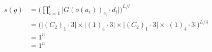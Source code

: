 \documentclass[preview]{standalone}
\begin{document}
\begin{align*}
s(g) &= \big(\prod_{i=1}^{l}\big|G(o(a_i))_{c_i}\cdot d_i\big|\big)^{L/l} \\   &= \big(\big|(C_2)_1\cdot 3\big| \times \big|(1)_4\cdot 3\big|\times \big|(C_2)_1\cdot 3\big| \times \big|(1)_4\cdot 3\big|)^{L/4} \\   &= 1^{n}\phantom{teee} \\   &= 1^{n}\phantom{teee}
\end{align*}
\end{document}
